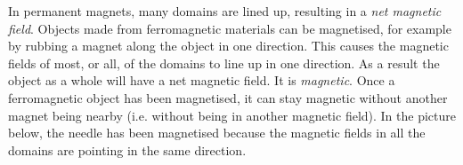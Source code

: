 


In permanent magnets, many domains are lined up, resulting in a \textit{net magnetic field}.
Objects made from ferromagnetic materials can be magnetised, for example by rubbing a magnet
along the object in one direction. This causes the magnetic fields of most, or all, of the domains to line up in one direction. As a result the object as a whole will have a net magnetic field. It is \textit{magnetic}. Once a ferromagnetic object has been magnetised, it can stay magnetic without another magnet being nearby (i.e. without being in another magnetic field). In the picture below, the needle has been magnetised because the magnetic fields in all the domains are pointing in the same direction. 

